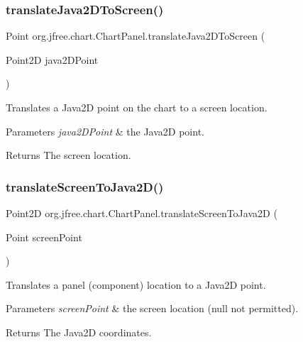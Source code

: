 \subsubsection{\texorpdfstring{translate\+Java2\+D\+To\+Screen()}{translateJava2DToScreen()}}
{\footnotesize\ttfamily Point org.\+jfree.\+chart.\+Chart\+Panel.\+translate\+Java2\+D\+To\+Screen (\begin{DoxyParamCaption}\item[{Point2D}]{java2\+D\+Point }\end{DoxyParamCaption})}

Translates a Java2D point on the chart to a screen location.


\begin{DoxyParams}{Parameters}
{\em java2\+D\+Point} & the Java2D point.\\
\hline
\end{DoxyParams}
\begin{DoxyReturn}{Returns}
The screen location. 
\end{DoxyReturn}
\mbox{\label{classorg_1_1jfree_1_1chart_1_1_chart_panel_a0855297bc0fdf566ae4e3298ec1a102d}} 
\subsubsection{\texorpdfstring{translate\+Screen\+To\+Java2\+D()}{translateScreenToJava2D()}}
{\footnotesize\ttfamily Point2D org.\+jfree.\+chart.\+Chart\+Panel.\+translate\+Screen\+To\+Java2D (\begin{DoxyParamCaption}\item[{Point}]{screen\+Point }\end{DoxyParamCaption})}

Translates a panel (component) location to a Java2D point.


\begin{DoxyParams}{Parameters}
{\em screen\+Point} & the screen location ({\ttfamily null} not permitted).\\
\hline
\end{DoxyParams}
\begin{DoxyReturn}{Returns}
The Java2D coordinates. 
\end{DoxyReturn}
\mbox{\label{classorg_1_1jfree_1_1chart_1_1_chart_panel_a26607f6991e37c7115a3bf04ebd34b8e}} 
